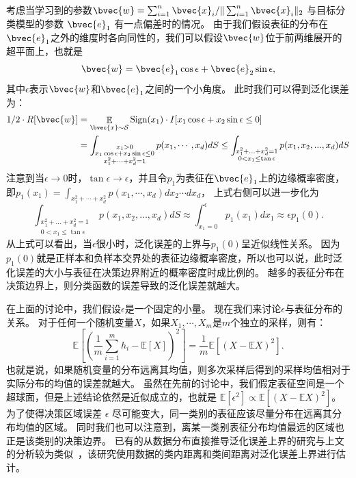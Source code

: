 考虑当学习到的参数$\bvec{w} = \sum_{i=1}^n \bvec{x}_i / \Vert \sum_{i=1}^n \bvec{x}_i \Vert_2$ 与目标分类模型的参数 $\bvec{e}_1$ 有一点偏差时的情况。
%
由于我们假设表征的分布在$\bvec{e}_1$之外的维度时各向同性的，我们可以假设$\bvec{w}$位于前两维展开的超平面上，也就是
\begin{equation}
    \bvec{w} = \bvec{e}_1 \cos \epsilon + \bvec{e}_2 \sin \epsilon,    
\end{equation}
其中$\epsilon$表示$\bvec{w}$和$\bvec{e}_1$之间的一个小角度。
%
此时我们可以得到泛化误差为：
\begin{equation}
\begin{split}
    1/2\cdot R[\bvec{w}] &= \mathop{\mathbb E}_{\bvec{x} \sim \mathcal S} \text{Sign}(x_1) \cdot I[x_1 \cos \epsilon + x_2 \sin \epsilon \le 0]
    \\
    & = \int_{\substack{x_1 > 0 \\ x_1 \cos \epsilon + x_2 \sin \epsilon \le 0 \\ x_1^2 + \cdots + x_d^2 = 1}} p(x_1, \cdots, x_d)dS
      \le \int_{\substack{x_1^2 + ... + x_d^2 = 1 \\0 < x_1 \le \tan\epsilon}}p(x_1, x_2, ...,x_d)dS
\end{split}
\end{equation}
注意到当$\epsilon \to 0$时，$\tan \epsilon \to \epsilon$，并且令$p_1$为表征在$\bvec{e}_1$上的边缘概率密度，即$p_1(x_1) = \int_{x_1^2 + \cdots + x_d^2} p(x_1, \cdots, x_d) dx_2\cdots dx_d$，
%
上式右侧可以进一步化为
\begin{equation}
    \int_{\substack{x_1^2 + ... + x_d^2 = 1 \\0 < x_1 \le \tan\epsilon}}p(x_1, x_2, ...,x_d)dS \approx \int_{x_1 = 0}^{\epsilon} p_1(x_1) dx_1 \approx \epsilon p_1(0).
\end{equation}
%
从上式可以看出，当$\epsilon$很小时，泛化误差的上界与$p_1(0)$呈近似线性关系。
因为$p_1(0)$就是正样本和负样本交界处的表征边缘概率密度，所以也可以说，此时泛化误差的大小与表征在决策边界附近的概率密度时成比例的。
越多的表征分布在决策边界上，则分类函数的误差导致的泛化误差就越大。

在上面的讨论中，我们假设$\epsilon$是一个固定的小量。
%
现在我们来讨论$\epsilon$与表征分布的关系。
%
对于任何一个随机变量$X$，如果$X_1, \cdots, X_m$是$m$个独立的采样，则有：
\begin{equation}
    \mathbb E \left[ \left(\dfrac{1}{m}\sum_{i=1}^m h_i - \mathbb E[X] \right)^2 \right] = \dfrac{1}{m} \mathbb E\left[\left(X -\mathbb EX\right)^2 \right].
\end{equation}
%
也就是说，如果随机变量的分布远离其均值，则多次采样后得到的采样均值相对于实际分布的均值的误差就越大。
%
虽然在先前的讨论中，我们假定表征空间是一个超球面，但是上述结论依然是近似成立的，也就是 $\mathbb E[\epsilon^2]\propto \mathbb E\left[(X - \mathbb EX)^2\right]$。
为了使得决策区域误差 $\epsilon$ 尽可能变大，同一类别的表征应该尽量分布在远离其分布均值的区域。
同时我们也可以注意到，离某一类别表征分布均值最远的区域也正是该类别的决策边界。
%
已有的从数据分布直接推导泛化误差上界的研究与上文的分析较为类似~\cite{jinpengzhan2020generalization}，该研究使用数据的类内距离和类间距离对泛化误差上界进行估计。


